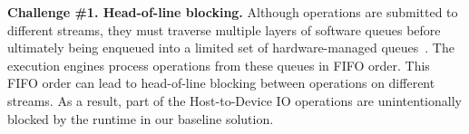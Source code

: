\noindent
\textbf{Challenge \#1. Head-of-line blocking.} 
Although operations are submitted to different streams, they must traverse multiple layers of software queues before ultimately being enqueued into a limited set of hardware-managed queues~\cite{olmedo-rtas-2020, otterness-rtns-2021}. 
The execution engines process operations from these queues in FIFO order. 
This FIFO order can lead to head-of-line blocking between operations on different streams. 
As a result, part of the Host-to-Device IO operations are unintentionally blocked by the runtime in our baseline solution.

\begin{comment}
While the operations on different streams are intended to be executed in parallel, it is not guaranteed by the runtime and hardware.
While operations are submitted to different streams, they have to go through multiple layers of software queues and are finally enqueued into a common set of limited number of hardware-managed queues~\cite{olmedo-rtas-2020, otterness-rtns-2021}.
The execution engines pop operations from these queues in FIFO order and carry out the popped operations.
The FIFO order enforced by these queues may result in head-of-line blocking between operations on different streams.
Figure~\ref{fig:io-challenge}(a) is simplified from a profiling trace that can manifest this issue.
Part of the Host-to-Device IO operations are unintentionally blocked by the runtime in our baseline solution.
\end{comment}

